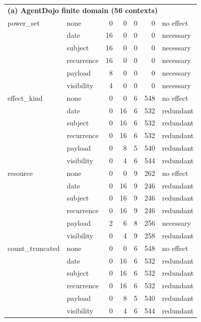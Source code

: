 \begin{table}[t]
\begin{tabular}{llrrrrl}
\midrule
\multicolumn{7}{l}{\textbf{(a) AgentDojo finite domain (56 contexts)}} \\
power\_set        & none       & 0  & 0  & 0 & 0   & no effect \\
                  & date       & 16 & 0  & 0 & 0   & necessary \\
                  & subject    & 16 & 0  & 0 & 0   & necessary \\
                  & recurrence & 16 & 0  & 0 & 0   & necessary \\
                  & payload    & 8  & 0  & 0 & 0   & necessary \\
                  & visibility & 4  & 0  & 0 & 0   & necessary \\
\midrule
effect\_kind      & none       & 0  & 0  & 6 & 548 & no effect \\
                  & date       & 0  & 16 & 6 & 532 & redundant \\
                  & subject    & 0  & 16 & 6 & 532 & redundant \\
                  & recurrence & 0  & 16 & 6 & 532 & redundant \\
                  & payload    & 0  & 8  & 5 & 540 & redundant \\
                  & visibility & 0  & 4  & 6 & 544 & redundant \\
\midrule
resource          & none       & 0  & 0  & 9 & 262 & no effect \\
                  & date       & 0  & 16 & 9 & 246 & redundant \\
                  & subject    & 0  & 16 & 9 & 246 & redundant \\
                  & recurrence & 0  & 16 & 9 & 246 & redundant \\
                  & payload    & 2  & 6  & 8 & 256 & necessary \\
                  & visibility & 0  & 4  & 9 & 258 & redundant \\
\midrule
count\_truncated  & none       & 0  & 0  & 6 & 548 & no effect \\
                  & date       & 0  & 16 & 6 & 532 & redundant \\
                  & subject    & 0  & 16 & 6 & 532 & redundant \\
                  & recurrence & 0  & 16 & 6 & 532 & redundant \\
                  & payload    & 0  & 8  & 5 & 540 & redundant \\
                  & visibility & 0  & 4  & 6 & 544 & redundant \\

\end{tabular}
\end{table}
